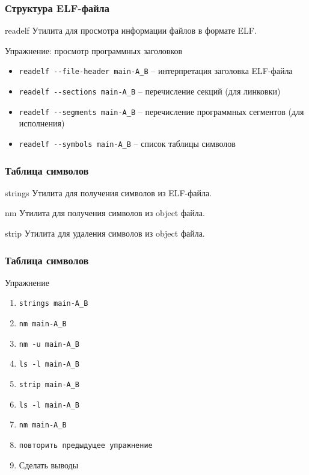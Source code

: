 \begin{frame}
	\frametitle{Структура ELF-файла}

	\begin{block}{readelf}
		Утилита для просмотра информации файлов в формате ELF.
	\end{block}

	\pause

	\begin{block}{Упражнение: просмотр программных заголовков}
		\begin{itemize}
			\item {\tt readelf -{}-file-header main-A\_B} -- интерпретация заголовка ELF-файла
			\item {\tt readelf -{}-sections main-A\_B} -- перечисление секций (для линковки)
			\item {\tt readelf -{}-segments main-A\_B} -- 
				перечисление программных сегментов (для исполнения)
			\item {\tt readelf -{}-symbols main-A\_B} -- список таблицы символов
		\end{itemize}
	\end{block}
\end{frame}

\begin{frame}
	\frametitle{Таблица символов}

	\begin{block}{strings}
		Утилита для получения символов из ELF-файла.
	\end{block}

	\begin{block}{nm}
		Утилита для получения символов из object файла.
	\end{block}

	\begin{block}{strip}
		Утилита для удаления символов из object файла.
	\end{block}
\end{frame}

\begin{frame}
	\frametitle{Таблица символов}

	\begin{block}{Упражнение}
		\begin{enumerate}
			\item {\tt strings main-A\_B}
			\item {\tt nm main-A\_B}
			\item {\tt nm -u main-A\_B}
			\item {\tt ls -l main-A\_B}
			\item {\tt strip main-A\_B}
			\item {\tt ls -l main-A\_B}
			\item {\tt nm main-A\_B}
			\item {\tt повторить предыдущее упражнение}
			\item Сделать выводы
		\end{enumerate}
	\end{block}

\end{frame}

